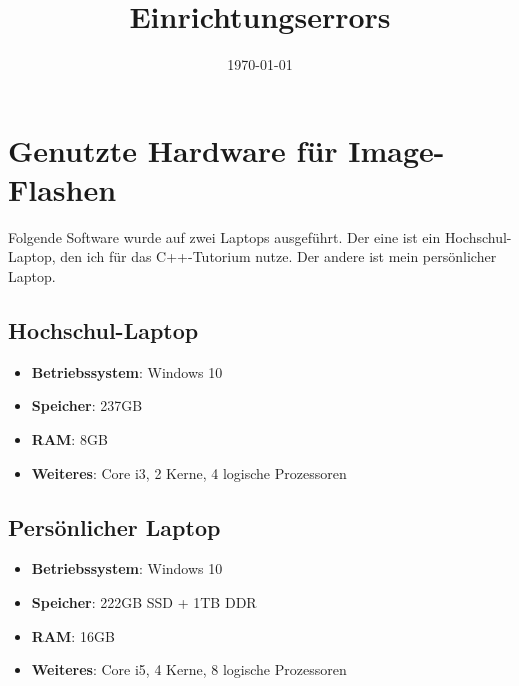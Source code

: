 \documentclass{article}
\title{Einrichtungserrors}
\author{}
\date{\today}
\begin{document}
\maketitle

\section{Genutzte Hardware für Image-Flashen}

Folgende Software wurde auf zwei Laptops ausgeführt. Der eine ist ein Hochschul-Laptop, den ich für das C++-Tutorium nutze. Der andere ist mein persönlicher Laptop.

\subsection{Hochschul-Laptop}
\begin{itemize}
    \item \textbf{Betriebssystem}: Windows 10
    \item \textbf{Speicher}: 237GB
    \item \textbf{RAM}: 8GB
    \item \textbf{Weiteres}: Core i3, 2 Kerne, 4 logische Prozessoren
\end{itemize}

\subsection{Persönlicher Laptop}
\begin{itemize}
    \item \textbf{Betriebssystem}: Windows 10
    \item \textbf{Speicher}: 222GB SSD + 1TB DDR
    \item \textbf{RAM}: 16GB
    \item \textbf{Weiteres}: Core i5, 4 Kerne, 8 logische Prozessoren
\end{itemize}

\newpage
\end{document}

